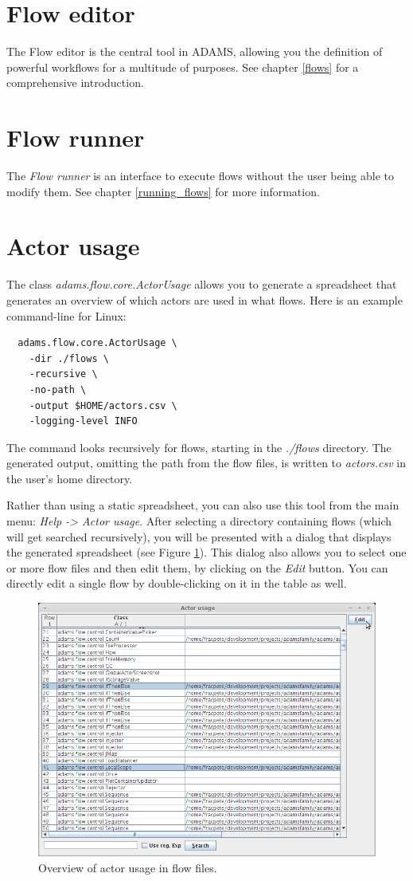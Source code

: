 \section{Flow editor}
The Flow editor is the central tool in ADAMS, allowing you the definition of
powerful workflows for a multitude of purposes. See chapter \ref{flows} for a
comprehensive introduction.

\section{Flow runner}
The \textit{Flow runner} is an interface to execute flows without the user
being able to modify them. See chapter \ref{running_flows} for more information.

\section{Actor usage}
The class \textit{adams.flow.core.ActorUsage} allows you to generate a spreadsheet 
that generates an overview of which actors are used in what flows. Here is an example 
command-line for Linux:
\begin{verbatim}
  adams.flow.core.ActorUsage \
    -dir ./flows \
    -recursive \
    -no-path \
    -output $HOME/actors.csv \
    -logging-level INFO
\end{verbatim}
The command looks recursively for flows, starting in the \textit{./flows}
directory. The generated output, omitting the path from the flow files, is 
written to \textit{actors.csv} in the user's home directory.

Rather than using a static spreadsheet, you can also use this tool from the 
main menu: \textit{Help -> Actor usage}. After selecting a directory containing
flows (which will get searched recursively), you will be presented with a dialog
that displays the generated spreadsheet (see Figure \ref{actor_usage}). This
dialog also allows you to select one or more flow files and then edit them,
by clicking on the \textit{Edit} button. You can directly edit a single flow
by double-clicking on it in the table as well.

\begin{figure}[htb]
  \centering
  \includegraphics[width=12.0cm]{images/actor_usage.png}
  \caption{Overview of actor usage in flow files.}
  \label{actor_usage}
\end{figure}

